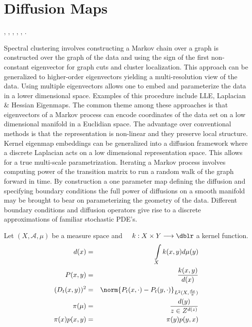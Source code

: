 \section*{Diffusion Maps}
\cite{DMBremerabstractdiffusion}, \cite{DMCarnegieinformationdiffusion}, \cite{DMCoifmandiffusionmaps},
\cite{DMKubota00reactiondiffusionsystems}, \cite{DMLafferty05diffusionkernels},
\cite{DMNadler06diffusionmaps}.

Spectral clustering involves constructing a Markov chain over a graph is constructed over the graph of the data and using the sign of the first non-constant eigenvector for graph cuts and cluster localization.  This approach can be generalized to higher-order eigenvectors yielding a multi-resolution view of the data. Using multiple eigenvectors allows one to embed and parameterize the data in a lower dimensional space.  Examples of this procedure include LLE, Laplacian \& Hessian Eigenmaps.  The common theme among these approaches is that eigenvectors of a Markov process can encode coordinates of the data set on a low dimensional manifold in a Euclidian space.  The advantage over conventional methods is that the representation is non-linear and they preserve local structure. Kernel eigenmap embeddings can be generalized into a diffusion  framework where a discrete Laplacian acts on a low dimensional representation space.  This allows for a true multi-scale parametrization.  Iterating a Markov process involves computing power of the transition matrix to run a random walk of the graph forward in time.   By construction a one parameter map defining the diffusion and specifying boundary conditions the full power of diffusions on a smooth manifold may be brought to bear on parameterizing the geometry of the data.  Different boundary conditions and diffusion operators give rise to a discrete approximations of familiar stochastic PDE's.

Let $(X,\mathcal{A},\mu)$ be a measure space and $\quad k: X \times Y \longrightarrow \dblr $ a kernel function.
 \begin{eqnarray}
 d(x) &=& \int\limits_{X} k(x,y) d \mu(y)  \\
 P(x,y) &=& \frac{ k(x,y) }{ d(x) }    \\
 (D_t (x,y))^2 &=& \norm{P_t(x, \cdot) - P_t(y,\cdot )}_{ L^2(X,\frac{d\mu}{\pi}) }  \\
 \pi(\mu) &=&  \frac{d(y)}{z \in Z^{d(z)} } \\
 \pi(x) p(x,y) &=& \pi(y) p(y,x)
 \end{eqnarray}


